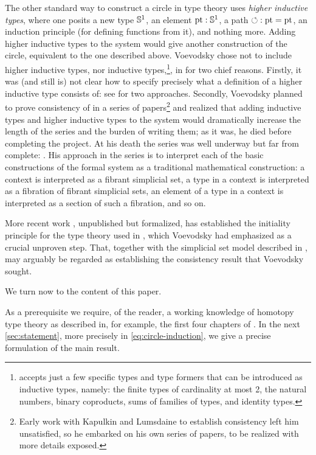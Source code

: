 \documentclass[a4paper,12pt]{amsart}
\begin{document}
The other standard way to construct a circle in type theory uses \emph{higher inductive types}, where one posits a new type ${\mathbb{S}^1}$, an element
${\mathord{\mathrm{pt}}} : {\mathbb{S}^1}$, a path ${\circlearrowleft} : {\mathord{\mathrm{pt}}} = {\mathord{\mathrm{pt}}}$, an induction principle (for defining functions from it), and nothing more.
%
Adding higher inductive types to the system would give another construction of the circle, equivalent to the one described above.
%
Voevodsky chose not to include higher inductive types, nor inductive types,\footnote{\UniMath{} accepts just a few specific types
  and type formers that can be introduced as inductive types, namely: the finite types of cardinality at most 2, the natural numbers, binary
  coproducts, sums of families of types, and identity types.},
in \UniMath{} for two chief reasons.
%
Firstly, it was (and still is) not clear how to specify precisely what a definition of a higher inductive type consists of: see
\cite{HoTT-Agda-HIT,1705.07088} for two approaches.
%
Secondly, Voevodsky planned to prove consistency of \UniMath{} in a series of papers\footnote{Early work \cite{1211.2851} with
  Kapulkin and Lumsdaine to establish consistency left him unsatisfied, so he embarked on his own series of papers, to be realized with more details
  exposed.} and realized that adding inductive types and higher inductive types to the system would dramatically increase the length of the
series and the burden of writing them; as it was, he died before completing the project.
%
At his death the series was well underway but far from complete: \cite{103,109,VV-relmonad,112,39,MR3607209,MR3607210}.
%
His approach in the series is to interpret each of the basic constructions of the formal system as a traditional mathematical construction: a
context is interpreted as a fibrant simplicial set, a type in a context is interpreted as a fibration of fibrant simplicial sets, an element of
a type in a context is interpreted as a section of such a fibration, and so on.

More recent work \cite{initiality-formalization,initiality}, unpublished but formalized, has established the initiality principle for the type
theory used in \UniMath, which Voevodsky had emphasized as a crucial unproven step.  That, together with the simplicial set model described in
\cite{1211.2851}, may arguably be regarded as establishing the consistency result that Voevodsky sought.

We turn now to the content of this paper.

As a prerequisite we require, of the reader, a working knowledge of homotopy type theory
as described in, for example, the first four chapters of \cite{hottbook}.
In the next \cref{sec:statement}, more precisely in \cref{eq:circle-induction},
we give a precise formulation of the main result.
\end{document}
